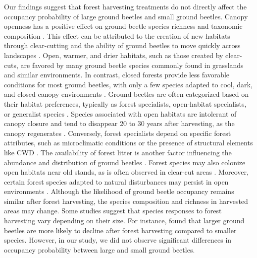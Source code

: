 Our findings suggest that forest harvesting treatments do not directly affect the occupancy probability of large ground beetles and small ground beetles. 
Canopy openness has a positive effect on ground beetle species richness and taxonomic composition \citep{Halme1993Carabidbeetles,Heliola2001Distributioncarabid,Koivula2002Alternativeharvesting}. 
This effect can be attributed to the creation of new habitats through clear-cutting and the ability of ground beetles to move quickly across landscapes \citep{Niemela2007effectsforestry}. 
Open, warmer, and drier habitats, such as those created by clear-cuts, are favored by many ground beetle species commonly found in grasslands and similar environments. 
In contrast, closed forests provide less favorable conditions for most ground beetles, with only a few species adapted to cool, dark, and closed-canopy environments \citep{Niemela1993Effectsclearcut,koivulaBorealCarabidbeetleColeoptera2002a}. 
Ground beetles are often categorized based on their habitat preferences, typically as forest specialists, open-habitat specialists, or generalist species \citep{Niemela2007effectsforestry}. 
Species associated with open habitats are intolerant of canopy closure and tend to disappear 20 to 30 years after harvesting, as the canopy regenerates \citep{Niemela1996importancesmallscale,Koivula2002Alternativeharvesting}. 
Conversely, forest specialists depend on specific forest attributes, such as microclimatic conditions or the presence of structural elements like CWD \citep{Niemela1996importancesmallscale,Heliola2001Distributioncarabid,Koivula2002Alternativeharvesting,Work2004Standcomposition}. 
The availability of forest litter is another factor influencing the abundance and distribution of ground beetles \citep{koivula.LeafLitterSmallscale1999,Heliola2001Distributioncarabid,Magura2005ImpactsLeaflitter}. 
Forest species may also colonize open habitats near old stands, as is often observed in clear-cut areas \citep{Spence1996Northernforestry,Koivula2002Alternativeharvesting}. 
Moreover, certain forest species adapted to natural disturbances may persist in open environments \citep{Niemela2007effectsforestry}. 
Although the likelihood of ground beetle occupancy remains similar after forest harvesting, the species composition and richness in harvested areas may change. 
Some studies suggest that species responses to forest harvesting vary depending on their size. 
For instance, \cite{Nolte2019Habitatspecialization} found that larger ground beetles are more likely to decline after forest harvesting compared to smaller species. 
However, in our study, we did not observe significant differences in occupancy probability between large and small ground beetles. 

